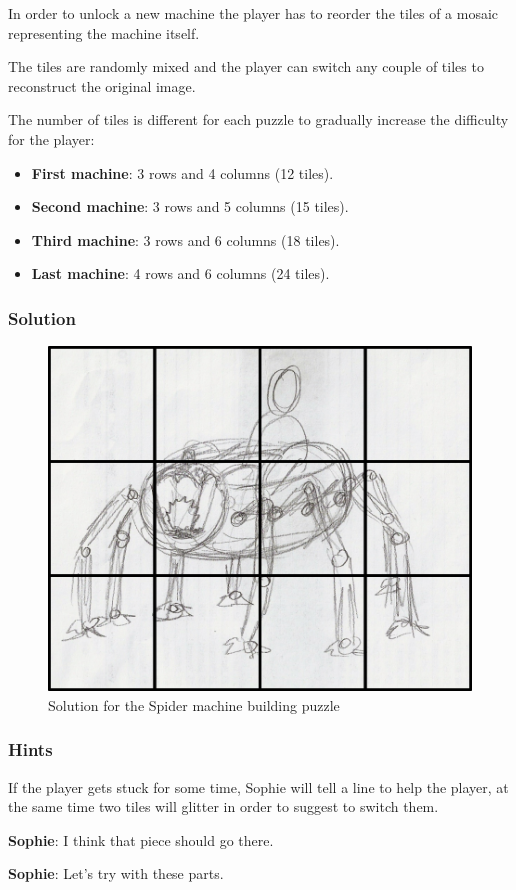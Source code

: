In order to unlock a new machine the player has to reorder the tiles of a mosaic representing the machine itself.

The tiles are randomly mixed and the player can switch any couple of tiles to reconstruct the original image.

The number of tiles is different for each puzzle to gradually increase the difficulty for the player:
\begin{itemize}
	\item \textbf{First machine}: 3 rows and 4 columns (12 tiles).
	\item \textbf{Second machine}: 3 rows and 5 columns (15 tiles).
	\item \textbf{Third machine}: 3 rows and 6 columns (18 tiles).
	\item \textbf{Last machine}: 4 rows and 6 columns (24 tiles).
\end{itemize}

\subsubsection*{Solution}
\begin{figure}[H]
  \centering
  \includegraphics[width=\textwidth]{Images/Puzzles/machineSolution}
  \caption{Solution for the Spider machine building puzzle}
\end{figure}


\subsubsection*{Hints}
If the player gets stuck for some time, Sophie will tell a line to help the player, at the same time two tiles will glitter in order to suggest to switch them.

\textbf{Sophie}: I think that piece should go there.

\textbf{Sophie}: Let's try with these parts.

